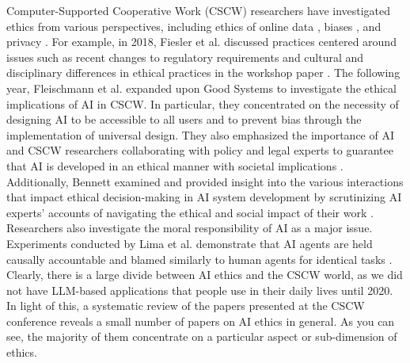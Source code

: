 \documentclass[sigconf]{acmart}
\begin{document}
Computer-Supported Cooperative Work (CSCW) researchers have investigated ethics from various perspectives, including ethics of online data \cite{vitak2016beyond}, biases \cite{10.1145/3462204.3481729}, and privacy \cite{yi2003privacy}. For example, in 2018, Fiesler et al. discussed practices centered around issues such as recent changes to regulatory requirements and cultural and disciplinary differences in ethical practices in the workshop paper \cite{fiesler2018research}. The following year, Fleischmann et al. expanded upon Good Systems to investigate the ethical implications of AI in CSCW. In particular, they concentrated on the necessity of designing AI to be accessible to all users and to prevent bias through the implementation of universal design. They also emphasized the importance of AI and CSCW researchers collaborating with policy and legal experts to guarantee that AI is developed in an ethical manner with societal implications \cite{10.1145/3311957.3359437}. Additionally, Bennett examined and provided insight into the various interactions that impact ethical decision-making in AI system development by scrutinizing AI experts' accounts of navigating the ethical and social impact of their work \cite{bennett2019investigating}. Researchers also investigate the moral responsibility of AI as a major issue. Experiments conducted by Lima et al. demonstrate that AI agents are held causally accountable and blamed similarly to human agents for identical tasks \cite{lima2021human}. Clearly, there is a large divide between AI ethics and the CSCW world, as we did not have LLM-based applications that people use in their daily lives until 2020. In light of this, a systematic review of the papers presented at the CSCW conference reveals a small number of papers on AI ethics in general. As you can see, the majority of them concentrate on a particular aspect or sub-dimension of ethics.
\end{document}
